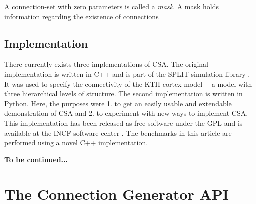 \documentclass{frontiersSCNS} %
\newcommand{\tbw}[1]{{\bf\parindent0pt\color{red}#1}}
\begin{document}
A connection-set with zero parameters is called a \emph{mask}. A mask
holds information regarding the existence of connections

\subsection{Implementation}\label{sec:impl}

There currently exists three implementations of CSA.  The original
implementation is written in C++ and is part of the SPLIT simulation
library \citep{djurfeldt05}.  It was used to specify the connectivity
of the KTH cortex model \citep{djurfeldt08}---a model with three
hierarchical levels of structure.  The second implementation is
written in Python.  Here, the purposes were 1. to get an easily usable
and extendable demonstration of CSA and 2. to experiment with new ways
to implement CSA. This implementation has been released as free
software under the GPL and is available at the INCF software center
\citep{djurfeldt10}.  The benchmarks in this article are performed
using a novel C++ implementation.

\tbw{To be continued...}


\section{The Connection Generator API}
\end{document}
